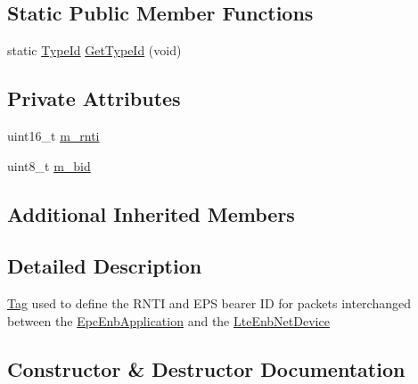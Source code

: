 \subsection*{Static Public Member Functions}
\begin{DoxyCompactItemize}
\item 
static \hyperlink{classns3_1_1TypeId}{Type\+Id} \hyperlink{classns3_1_1EpsBearerTag_a1455383cc36c287e31f8156116019a7d}{Get\+Type\+Id} (void)
\end{DoxyCompactItemize}
\subsection*{Private Attributes}
\begin{DoxyCompactItemize}
\item 
uint16\+\_\+t \hyperlink{classns3_1_1EpsBearerTag_a22f1c0bf972caa56ccf216ac805ae22e}{m\+\_\+rnti}
\item 
uint8\+\_\+t \hyperlink{classns3_1_1EpsBearerTag_a8419ef340b35a4814bd230b1631dfd57}{m\+\_\+bid}
\end{DoxyCompactItemize}
\subsection*{Additional Inherited Members}


\subsection{Detailed Description}
\hyperlink{classns3_1_1Tag}{Tag} used to define the R\+N\+TI and E\+PS bearer ID for packets interchanged between the \hyperlink{classns3_1_1EpcEnbApplication}{Epc\+Enb\+Application} and the \hyperlink{classns3_1_1LteEnbNetDevice}{Lte\+Enb\+Net\+Device} 

\subsection{Constructor \& Destructor Documentation}

